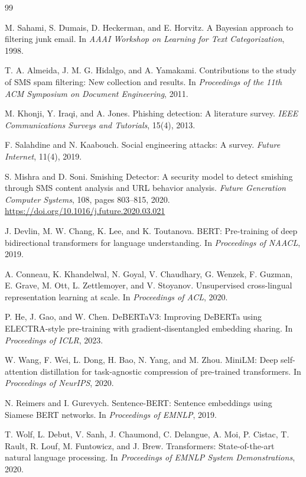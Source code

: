 \documentclass[11pt]{article}
\begin{document}
\begin{thebibliography}{99}

M. Sahami, S. Dumais, D. Heckerman, and E. Horvitz.
A Bayesian approach to filtering junk email.
In \textit{AAAI Workshop on Learning for Text Categorization}, 1998.

T. A. Almeida, J. M. G. Hidalgo, and A. Yamakami.
Contributions to the study of SMS spam filtering: New collection and results.
In \textit{Proceedings of the 11th ACM Symposium on Document Engineering}, 2011.

M. Khonji, Y. Iraqi, and A. Jones.
Phishing detection: A literature survey.
\textit{IEEE Communications Surveys and Tutorials}, 15(4), 2013.

F. Salahdine and N. Kaabouch.
Social engineering attacks: A survey.
\textit{Future Internet}, 11(4), 2019.

S. Mishra and D. Soni.
Smishing Detector: A security model to detect smishing through SMS content analysis and URL behavior analysis.
\textit{Future Generation Computer Systems}, 108, pages 803--815, 2020.
\url{https://doi.org/10.1016/j.future.2020.03.021}

J. Devlin, M. W. Chang, K. Lee, and K. Toutanova.
BERT: Pre-training of deep bidirectional transformers for language understanding.
In \textit{Proceedings of NAACL}, 2019.

A. Conneau, K. Khandelwal, N. Goyal, V. Chaudhary, G. Wenzek, F. Guzman, E. Grave, M. Ott, L. Zettlemoyer, and V. Stoyanov.
Unsupervised cross-lingual representation learning at scale.
In \textit{Proceedings of ACL}, 2020.

P. He, J. Gao, and W. Chen.
DeBERTaV3: Improving DeBERTa using ELECTRA-style pre-training with gradient-disentangled embedding sharing.
In \textit{Proceedings of ICLR}, 2023.

W. Wang, F. Wei, L. Dong, H. Bao, N. Yang, and M. Zhou.
MiniLM: Deep self-attention distillation for task-agnostic compression of pre-trained transformers.
In \textit{Proceedings of NeurIPS}, 2020.

N. Reimers and I. Gurevych.
Sentence-BERT: Sentence embeddings using Siamese BERT networks.
In \textit{Proceedings of EMNLP}, 2019.

T. Wolf, L. Debut, V. Sanh, J. Chaumond, C. Delangue, A. Moi, P. Cistac, T. Rault, R. Louf, M. Funtowicz, and J. Brew.
Transformers: State-of-the-art natural language processing.
In \textit{Proceedings of EMNLP System Demonstrations}, 2020.


\end{thebibliography}
\end{document}
